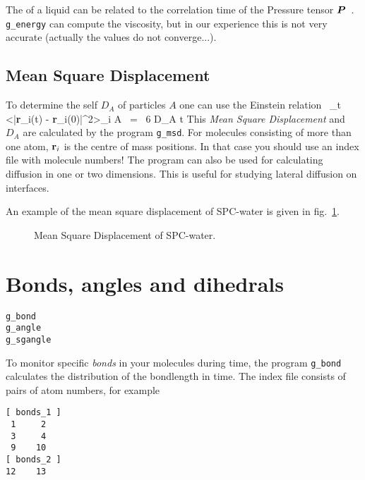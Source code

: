 The  of a liquid can be related to the correlation 
time of the Pressure tensor $\mbox{\boldmath ${P}$}$~\cite{PSmith93c,Balasubramanian96}.
{\tt g\_energy} can compute the viscosity, but in our experience this is not very
accurate (actually the values do not converge...).

\subsection{Mean Square Displacement}
\label{sec:msd}
To determine the self  $D_A$ of particles $A$ one
can use the Einstein relation~\cite{Allen87} \beq \lim_{t \rightarrow
\infty} <|{\bf r}_i(t) - {\bf r}_i(0)|^2>_{i \in A} ~=~ 6 D_A t \eeq
This {\em Mean Square Displacement} and $D_A$ are calculated by the
program {\tt g\_msd}. For molecules consisting of more than one atom,
${\bf r}_i$ is the centre of mass positions. In that case you should
use an index file with molecule numbers! The program can also be used
for calculating diffusion in one or two dimensions. This is useful for
studying lateral diffusion on interfaces. 

An example of the mean square displacement of SPC-water is given in
fig.~\ref{fig:msdwater}.
%
\begin{figure}
\centerline{
{}}
\caption{Mean Square Displacement of SPC-water.}
\label{fig:msdwater}
\end{figure}
%

% 
% 
\section{Bonds, angles and dihedrals}
\label{sec:bad}
\begin{verbatim}
g_bond
g_angle
g_sgangle
\end{verbatim}
To monitor specific {\em bonds} in your molecules during time, the program 
{\tt g\_bond} calculates the distribution of the bondlength in time. 
The index file consists of pairs of atom numbers, for example
{\samepage
\begin{verbatim}
[ bonds_1 ]
 1     2
 3     4
 9    10
[ bonds_2 ]
12    13
\end{verbatim}
}

